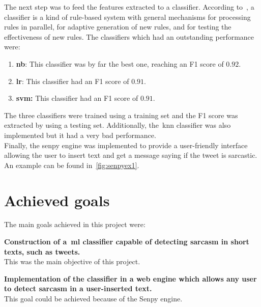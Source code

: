 The next step was to feed the features extracted to a classifier. According to~\cite{clasif}, a classifier is a kind of rule-based system with general mechanisms for processing rules in parallel, for adaptive generation of new rules, and for testing the effectiveness of new rules. The classifiers which had an outstanding performance were:
\begin{enumerate}
	\item \textbf{\acl{nb}}: This classifier was by far the best one, reaching an F1 score of $0.92$.
	\item \textbf{\acl{lr}}: This classifier had an F1 score of $0.91$.
	\item \textbf{\acl{svm}:} This classifier had an F1 score of $0.91$.
\end{enumerate} 
The three classifiers were trained using a training set and the F1 score was extracted by using a testing set.
Additionally, the~\acl{knn} classifier was also implemented but it had a very bad performance.\\
Finally, the senpy engine was implemented to provide a user-friendly interface allowing the user to insert text and get a message saying if the tweet is sarcastic. An example can be found in~\cref{fig:senpyex1}.

\section{Achieved goals}
The main goals achieved in this project were:
\begin{description}
	\item \textbf{Construction of a~\ac{ml} classifier capable of detecting sarcasm in short texts, such as tweets.}\\
	This was the main objective of this project.
	\item \textbf{Implementation of the classifier in a web engine which allows any user to detect sarcasm in a user-inserted text.}\\
	This goal could be achieved because of the Senpy engine.
	
\end{description}

